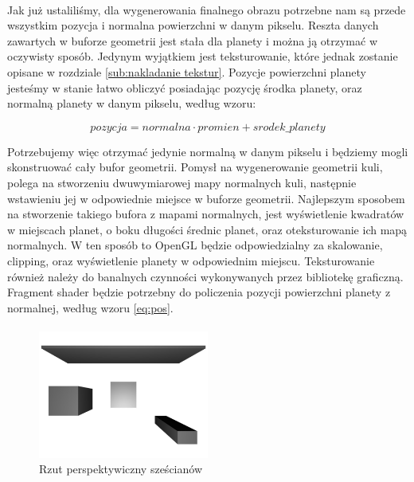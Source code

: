 \paragraph{}

Jak już ustaliliśmy, dla wygenerowania finalnego obrazu potrzebne nam są przede wszystkim pozycja i normalna powierzchni w danym pikselu. Reszta danych zawartych w buforze geometrii jest stała dla planety i można ją otrzymać w oczywisty sposób. Jedynym wyjątkiem jest teksturowanie, które jednak zostanie opisane w rozdziale \hyperref[sub:nakladanie tekstur]{\ref{sub:nakladanie tekstur}}. Pozycje powierzchni planety jesteśmy w stanie łatwo obliczyć posiadając pozycję środka planety, oraz normalną planety w danym pikselu, według wzoru:

\begin{equation} \label{eq:pos}
pozycja = normalna \cdot promien + srodek\_planety
\end{equation}

Potrzebujemy więc otrzymać jedynie normalną w danym pikselu i będziemy mogli skonstruować cały bufor geometrii. Pomysł na wygenerowanie geometrii kuli, polega na stworzeniu dwuwymiarowej mapy normalnych kuli, następnie wstawieniu jej w odpowiednie miejsce w buforze geometrii. Najlepszym sposobem na stworzenie takiego bufora z mapami normalnych, jest wyświetlenie kwadratów w miejscach planet, o boku długości średnic planet, oraz oteksturowanie ich mapą normalnych. W ten sposób to OpenGL będzie odpowiedzialny za skalowanie, clipping, oraz wyświetlenie planety w odpowiednim miejscu. Teksturowanie również należy do banalnych czynności wykonywanych przez bibliotekę graficzną. Fragment shader będzie potrzebny do policzenia pozycji powierzchni planety z normalnej, według wzoru \hyperref[eq:pos]{\ref{eq:pos}}.

\paragraph{}

\begin{figure}
\centering
\label{fig:proj}
	\includegraphics[width=0.5\textwidth]{img/proj_rend.jpg}
\caption{Rzut perspektywiczny sześcianów}
\end{figure}

